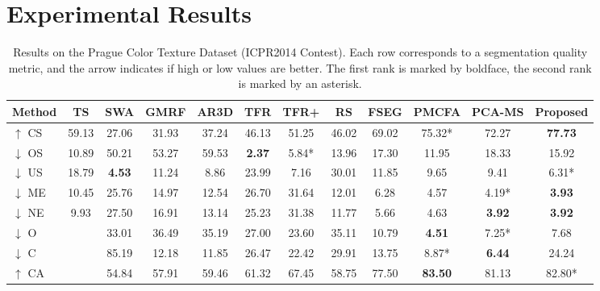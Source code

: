 \documentclass[journal]{IEEEtran}
\newcommand{\Idea}[1]{{\ifdefined\DRAFT{\color{blue}#1}\fi}}
\begin{document}
\section{Experimental Results}
\begin{table*}[!htbp]
\centering
\caption{Results on the Prague Color Texture Dataset (ICPR2014 Contest).
Each row corresponds to a  segmentation quality metric,
and the arrow indicates if high or low values are better.
The first rank is marked by boldface, 
the second rank is marked by an asterisk.
\Idea{Stand 2016-06-03}}
\label{tbl:PragueColor_ICPR2014}
\begin{tabular}{@{} l *{11}{S[table-format=2.3,detect-inline-weight=math,table-align-text-post=false]} @{}}\toprule
{Method}         & {TS}  & {SWA}         & {GMRF}& {AR3D} & {TFR}         & {TFR+}& {RS}           & {FSEG}& {PMCFA}            & {PCA-MS}          & {Proposed}  \\
\midrule
$\uparrow$ CS    & 59.13 & 27.06         & 31.93 & 37.24  & 46.13         & 51.25 & 46.02          & 69.02 & 75.32*             & 72.27             & \bfseries 77.73   \\
$\downarrow$ OS  & 10.89 & 50.21         & 53.27 & 59.53  & \bfseries 2.37 & 5.84* & 13.96         & 17.30 & 11.95              & 18.33             & 15.92             \\
$\downarrow$ US  & 18.79 & \bfseries 4.53 & 11.24 & 8.86   & 23.99         & 7.16  & 30.01         & 11.85 & 9.65               & 9.41              & 6.31*             \\
$\downarrow$ ME  & 10.45 & 25.76         & 14.97 & 12.54  & 26.70         & 31.64 & 12.01          & 6.28  & 4.57               & 4.19*             & \bfseries 3.93    \\
$\downarrow$ NE  & 9.93  & 27.50         & 16.91 & 13.14  & 25.23         & 31.38 & 11.77          & 5.66  & 4.63               & \bfseries 3.92    & \bfseries 3.92    \\
$\downarrow$ O   &       & 33.01         & 36.49 & 35.19  & 27.00         & 23.60 & 35.11          & 10.79 & \bfseries 4.51     & 7.25*             & 7.68              \\
$\downarrow$ C   &       & 85.19         & 12.18 & 11.85  & 26.47         & 22.42 & 29.91          & 13.75 & 8.87*              & \bfseries 6.44    & 24.24             \\
$\uparrow$ CA    &       & 54.84         & 57.91 & 59.46  & 61.32         & 67.45 & 58.75          & 77.50 & \bfseries 83.50    & 81.13             & 82.80*            \\

\end{tabular}
\end{table*}
\end{document}
